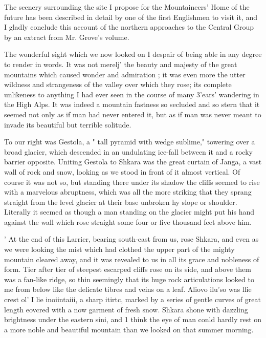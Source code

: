 \documentclass{article}
\begin{document}
The scenery surrounding the site I propose for the Mountaineers' Home of the future has been described in detail by one of the first Englishmen to visit it, and I gladly conclude this account of the northern approaches to the Central Group by an extract from Mr. Grove's volume.

The wonderful sight which we now looked on I despair of being able in any degree to render in words. It was not merelj' the beauty and majesty of the great mountains which caused wonder and admiration ; it was even more the utter wildness and strangeness of the valley over which they rose; its complete unlikeness to anything I had ever seen in the course of many 3'ears' wandering in the High Alps. It was indeed a mountain fastness so secluded and so stern that it seemed not only as if man had never entered it, but as if man was never meant to invade its beautiful but terrible solitude.

To our right was Gestola, a " tall pyramid with wedge sublime," towering over a broad glacier, which descended in an undulating ice-fall between it and a rocky barrier opposite. Uniting Gestola to Shkara was the great curtain of Janga, a vast wall of rock and snow, looking as we stood in front of it almost vertical. Of course it was not so, but standing there under its shadow the cliffs seemed to rise with a marvelous abruptness, which was all the more striking that they sprang straight from the level glacier at their base unbroken hy slope or shoulder. Literally it seemed as though a man standing on the glacier might put his hand against the wall which rose straight some four or five thousand feet above him.

' At the end of this Larrier, bearing south-east from us, rose Shkara, and even as we were looking the mist which had clothed the upper part of the mighty mountain cleared away, and it was revealed to us in all its grace and nobleness of form. Tier after tier of steepest escarped cliffs rose on its side, and above them was a fan-like ridge, so thin seemingly that its huge rock articulations looked to me from below like the delicate tibres and veins on a leaf. Aliovo ilu'so was llie crest ol' I lie inoiintaiii, a sharp itirtc, marked by a series of gentle curves of great length eovcred with a now garment of fresh snow. Shkara shone with dazzling brightness under the eastern sini, and 1 think the eye of man conld hardly rest on a more noble and beautiful mountain than we looked on that summer morning.
\end{document}
